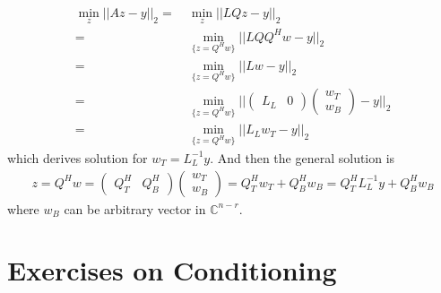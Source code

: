 \documentclass[11pt,a4paper]{article}
\begin{document}
\section{}
\begin{align}
     \min_z || Az - y ||_2
    =\ & \min_z || LQz - y ||_2 \\
    =\ & \min_{\{z=Q^H w\}} || LQQ^Hw - y ||_2 \\
    =\ & \min_{\{z=Q^H w\}} || Lw - y ||_2 \\
    =\ & \min_{\{z=Q^H w\}} || 
    \left( \begin{array}{c|c} L_L & 0 \end{array} \right)
    \left( \begin{array}{c} w_T \\ \hline w_B \end{array} \right)
    - y ||_2 \\
    =\ & \min_{\{z=Q^H w\}} || L_L w_T - y ||_2
\end{align}
which derives solution for $w_T = L_L^{-1} y$. And then the general solution
is 
\begin{align}
    z = Q^H w = 
    \left( \begin{array}{c|c} Q_T^H & Q_B^H \end{array} \right)
    \left( \begin{array}{c} w_T \\ \hline w_B \end{array} \right)
    = Q_T^H w_T + Q_B^H w_B
    = Q_T^H L_L^{-1} y + Q_B^H w_B
\end{align}
where $w_B$ can be arbitrary vector in $\mathbb{C}^{n-r}$.

\newpage
\section{}


\newpage
\section{}



\newpage
\part{Exercises on Conditioning}
\setcounter{section}{0}
\end{document}
